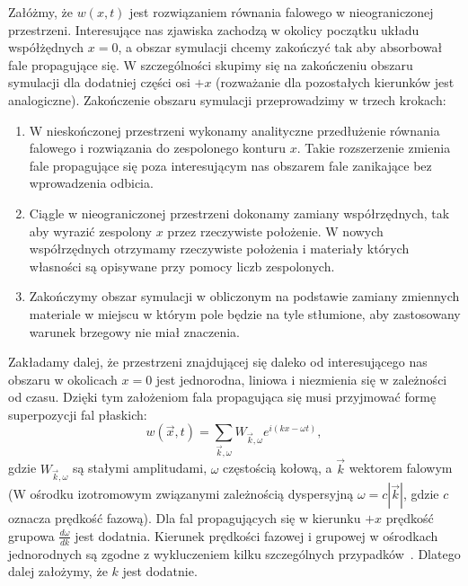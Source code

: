 Załóżmy, że $w(x,t)$ jest rozwiązaniem równania falowego w nieograniczonej przestrzeni. Interesujące nas zjawiska zachodzą w okolicy początku układu współżędnych $x=0$, a obszar symulacji chcemy zakończyć tak aby absorbował fale propagujące się. W szczególności skupimy się na zakończeniu obszaru symulacji dla dodatniej części osi $+x$ (rozważanie dla pozostałych kierunków jest analogiczne). Zakończenie obszaru symulacji przeprowadzimy w trzech krokach:
\begin{enumerate}
	\item W nieskończonej przestrzeni wykonamy analityczne przedłużenie równania falowego i rozwiązania do zespolonego konturu $x$. Takie rozszerzenie zmienia fale propagujące się poza interesującym nas obszarem  fale zanikające bez wprowadzenia odbicia.
	\item Ciągle w nieograniczonej przestrzeni dokonamy zamiany współrzędnych, tak aby wyrazić zespolony $x$ przez rzeczywiste położenie. W nowych współrzędnych otrzymamy rzeczywiste położenia i materiały których własności są opisywane przy pomocy liczb zespolonych.
	\item Zakończymy obszar symulacji w obliczonym na podstawie zamiany zmiennych materiale w miejscu w którym pole będzie na tyle stłumione, aby zastosowany warunek brzegowy nie miał znaczenia.
\end{enumerate}

Zakładamy dalej, że przestrzeni znajdującej się daleko od interesującego nas obszaru w okolicach $x=0$ jest jednorodna, liniowa i niezmienia się w zależności od czasu. Dzięki tym założeniom fala propagująca się musi przyjmować formę superpozycji fal płaskich:
\begin{equation}
	w(\vec{x},t)= \sum_{\vec{k},\omega} W_{\vec{k},\omega} e^{i (kx-\omega t)},
\end{equation}
gdzie $W_{\vec{k},\omega}$ są stałymi amplitudami, $\omega$ częstością kołową, a $\vec{k}$ wektorem falowym (W ośrodku izotromowym związanymi zależnością dyspersyjną $\omega=c|\vec{k}|$, gdzie $c$ oznacza prędkość fazową). Dla fal propagujących się w kierunku $+x$ prędkość grupowa $\frac{d \omega}{d k}$ jest dodatnia. Kierunek prędkości fazowej i grupowej w ośrodkach jednorodnych są zgodne z wykluczeniem kilku szczególnych przypadków~\cite{teixeira1998general}. Dlatego dalej założymy, że $k$ jest dodatnie. 


